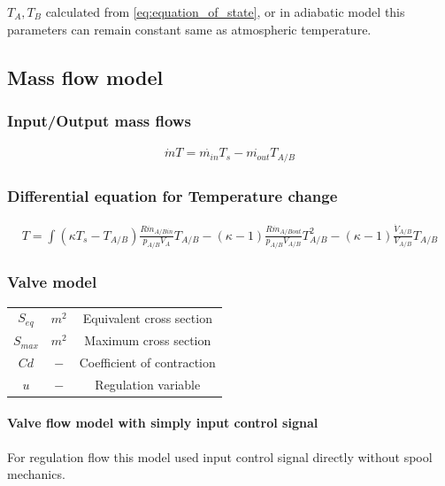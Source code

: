 \documentclass[class=article, crop=false]{standalone}
\begin{document}
$T_A, T_B$ calculated from \ref{eq:equation_of_state}, or in adiabatic
model this parameters can remain constant same as atmospheric temperature.

\subsection{Mass flow model}

\subsubsection{Input/Output mass flows}

\begin{align}
    \dot{m}T = \dot{m_{in}}T_s - \dot{m_{out}}T_{A/B}
\end{align}


\subsubsection{Differential equation for Temperature change}
\begin{align}
    T = \int{ (\kappa T_s - T_{A/B})
        \frac{R\dot{m}_{A/Bin}}{p_{A/B}V_{A}}T_{A/B} -
    (\kappa-1)\frac{R\dot{m}_{A/Bout}}{p_{A/B}V_{A/B}} T_{A/B}^2 -
(\kappa-1)\frac{\dot{V}_{A/B}}{V_{A/B}}T_{A/B}}
\end{align}


\subsubsection{Valve model} %
\begin{tabular}{ |c|c|c| }
    \hline
    $S_{eq}$                & $m^2$         & Equivalent cross section \\
    $S_{max}$               & $m^2$         & Maximum cross section \\
    $Cd$                    & $-$           & Coefficient of contraction \\
    $u$                     & $-$           & Regulation variable \\
    \hline
\end{tabular}

\paragraph{Valve flow model with simply input control signal}
For regulation flow this model used input control signal directly without
spool mechanics.
\end{document}
